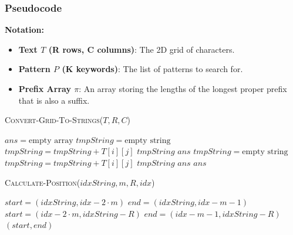         \subsubsection{Pseudocode}
            \textbf{Notation:}
            \begin{itemize}
                \item \textbf{Text $T$ (R rows, C columns)}: The 2D grid of characters.
                \item \textbf{Pattern $P$ (K keywords)}: The list of patterns to search for.
                \item \textbf{Prefix Array $\pi$}: An array storing the lengths of the longest proper prefix that is also a suffix.
            \end{itemize}

            \textsc{Convert-Grid-To-Strings}($T, R, C$)
            \begin{algorithmic}[1]
            \State $ans = \text{empty array}$
            \Statex
                \State $tmpString = \text{empty string}$
                    \State $tmpString = tmpString + T[i][j]$
                \EndFor
                \State {} $tmpString$  $ans$
            \EndFor
            \Statex
                \State $tmpString = \text{empty string}$
                    \State $tmpString = tmpString + T[i][j]$
                \EndFor
                \State {} $tmpString$  $ans$
            \EndFor
            \State \Return $ans$
            \end{algorithmic}

            \textsc{Calculate-Position}($idxString, m, R, idx$)
            \begin{algorithmic}[1]
                \Statex
                \State $start = (idxString, idx - 2 \cdot m)$
                \State $end = (idxString, idx - m - 1)$
            \Else
                \Statex
                \State $start = (idx - 2 \cdot m, idxString - R)$
                \State $end = (idx - m - 1, idxString - R)$
            \EndIf
            \State \Return $(start, end)$
            \end{algorithmic}

